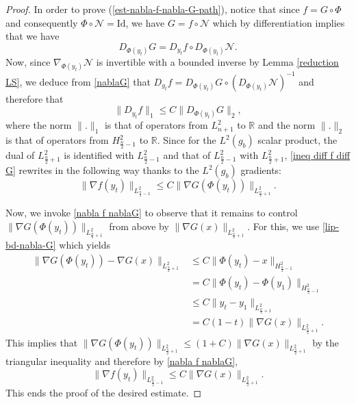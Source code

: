 \documentclass[a4paper,11pt,reqno]{amsart}
\numberwithin{equation}{section}
\begin{document}
\begin{proof}
		In order to prove (\ref{est-nabla-f-nabla-G-path}), notice that since $f = G\circ \Phi$ and consequently $\Phi\circ \mathcal{N} = \mathrm{Id}$, we have $G = f\circ \mathcal{N}$ which by differentiation implies that we have
\begin{equation}
    D_{\Phi(y_t)} G = D_{y_t}f\circ D_{\Phi(y_t)} \mathcal{N}.\label{nablaG}
\end{equation}
Now, since $ \nabla_{\Phi(y_t)}\mathcal{N} $ is invertible with a bounded inverse by Lemma \ref{reduction LS}, we deduce from \eqref{nablaG} that $D_{y_t}f = D_{\Phi(y_t)} G\circ (D_{\Phi(y_t)} \mathcal{N})^{-1}$ and therefore that
\begin{equation}
    \|D_{y_t}f\|_1\leq C \|D_{\Phi(y_t)} G\|_2,\label{ineq diff f diff G}
\end{equation} 
where the norm $\|.\|_1$ is that of operators from $L^2_{n+1}$ to $\mathbb{R}$ and the norm $\|.\|_2$ is that of operators from $H^2_{\frac{n}{2}-1}$ to $\mathbb{R}$. Since for the $L^2(g_b)$ scalar product, the dual of $L^2_{\frac{n}{2}+1}$ is identified with $L^2_{\frac{n}{2}-1}$ and that of $L^2_{\frac{n}{2}-1}$ with
$L^2_{\frac{n}{2}+1}$, \eqref{ineq diff f diff G} rewrites in the following way thanks to the $L^2(g_b)$ gradients:
\begin{equation}
    \|\nabla f(y_t)\|_{L^2_{\frac{n}{2}-1}}\leq C\|\nabla G (\Phi(y_t))\|_{L^2_{\frac{n}{2}+1}}.\label{nabla f nablaG}
\end{equation}


 Now, we invoke \eqref{nabla f nablaG} to observe that it remains to control $\|\nabla G(\Phi(y_t))\|_{L^2_{\frac{n}{2}+1}}$ from above by $\|\nabla G(x)\|_{L^2_{\frac{n}{2}+1}}$. For this, we use \eqref{lip-bd-nabla-G} which yields 
\begin{equation*}
\begin{split}
    \|\nabla G(\Phi(y_t))-\nabla G(x)\|_{L^2_{\frac{n}{2}+1}}
    &\leq C\|\Phi(y_t)-x\|_{H^2_{\frac{n}{2}-1}}\\
    &= C \|\Phi(y_t)-\Phi(y_1)\|_{H^2_{\frac{n}{2}-1}}\\
    &\leq C\|y_t-y_1\|_{L^2_{\frac{n}{2}+1}}\\
    &= C (1-t)\|\nabla G(x)\|_{L^2_{\frac{n}{2}+1}}.
    \end{split}
\end{equation*}
This implies that $\|\nabla G(\Phi(y_t))\|_{L^2_{\frac{n}{2}+1}}\leq (1+C)\|\nabla G(x)\|_{L^2_{\frac{n}{2}+1}}$ by the triangular inequality and therefore by \eqref{nabla f nablaG},
\begin{equation}
    \|\nabla f(y_t)\|_{L^2_{\frac{n}{2}-1}}\leq C \|\nabla G(x)\|_{L^2_{\frac{n}{2}+1}}.\label{nabla f nablaG(x)}
\end{equation}
This ends the proof of the desired estimate.
	\end{proof}
	
\end{document}
